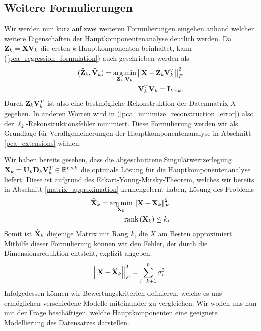 \subsection{Weitere Formulierungen} 

Wir werden nun kurz auf zwei weiteren Formulierungen eingehen anhand welcher weitere Eigenschaften der Hauptkomponentenanalyse deutlich werden. Da $\mathbf{Z}_k = \mathbf{X} \mathbf{V}_k$ die ersten $k$ Hauptkomponenten beinhaltet, kann (\ref{pca_regression_formulation}) auch geschrieben werden als
\begin{align}
\label{pca_minimize_reconstruction_error}
\begin{split}
(\widehat{\mathbf{Z}}_k, \widehat{\mathbf{V}}_k) = \operatorname*{arg\,min}_{\mathbf{Z}_k, \mathbf{V}_k} \left\lVert \mathbf{X} - \mathbf{Z}_k \mathbf{V}_k^T \right\rVert_{F}^{2}\\
\mathbf{V}_k^T\mathbf{V}_k = \mathbf{I}_{k \times k}.
\end{split}
\end{align}
Durch $\mathbf{Z}_k \mathbf{V}_k^T$ ist also eine bestmögliche Rekonstruktion der Datenmatrix $X$ gegeben. In anderen Worten wird in (\ref{pca_minimize_reconstruction_error}) also der $\ell_2$-Rekonstruktionsfehler minimiert. Diese Formulierung werden wir als Grundlage für Verallgemeinerungen der Hauptkomponentenanalyse in Abschnitt \ref{pca_extensions} wählen.

Wir haben bereits gesehen, dass die abgeschnittene Singulärwertzerlegung $\mathbf{X}_k = \mathbf{U}_k \mathbf{D}_k \mathbf{V}_k^T \in \mathbb{R}^{n \times k}$ die optimale Lösung für die Hauptkomponentenanalyse liefert. Diese ist aufgrund des Eckart-Young-Mirsky-Theorem, welches wir bereits in Abschnitt \ref{matrix_approximation} kennengelernt haben, Lösung des Problems
\begin{align}
\begin{split}
\widehat{\mathbf{X}}_k = \operatorname*{arg\,min}_{\mathbf{X}_k} \left\lVert \mathbf{X} - \mathbf{X}_k \right\rVert_F^2\\
\text{rank} \left( \mathbf{X}_k \right) \leq k.
\end{split}
\end{align}
Somit ist $\widehat{\mathbf{X}}_k$ diejenige Matrix mit Rang $k$, die $X$ am Besten approximiert. Mithilfe dieser Formulierung können wir den Fehler, der durch die Dimensionsreduktion entsteht, explizit angeben:
\begin{align*}
\left\lVert \mathbf{X} - \widehat{\mathbf{X}}_k \right\rVert_F^2 = \sum_{i=k+1}^p \sigma_i^2.
\end{align*}
Infolgedessen können wir Bewertungskriterien definieren, welche es uns ermöglichen verschiedene Modelle miteinander zu vergleichen. Wir wollen uns nun mit der Frage beschäftigen, welche Hauptkomponenten eine geeignete Modellierung des Datensatzes darstellen.

